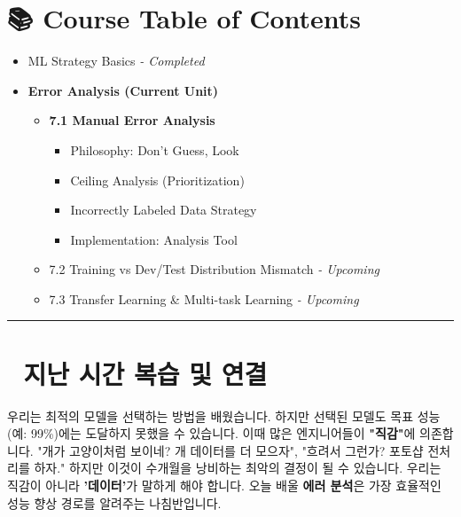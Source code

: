 \documentclass[11pt,a4paper]{book}
\theoremstyle{definition}
\begin{document}
\section*{📚 Course Table of Contents}
\begin{itemize}
    \item[Chapter 1-6.] ML Strategy Basics \textit{- Completed}
    \item[\textbf{Chapter 7.}] \textbf{Error Analysis (Current Unit)}
    \begin{itemize}
        \item \textbf{7.1 Manual Error Analysis}
        \begin{itemize}
            \item Philosophy: Don't Guess, Look
            \item Ceiling Analysis (Prioritization)
            \item Incorrectly Labeled Data Strategy
            \item Implementation: Analysis Tool
        \end{itemize}
        \item 7.2 Training vs Dev/Test Distribution Mismatch \textit{- Upcoming}
        \item 7.3 Transfer Learning \& Multi-task Learning \textit{- Upcoming}
    \end{itemize}
\end{itemize}

\vspace{0.5cm}
\hrule
\vspace{0.5cm}

\section*{🔗 지난 시간 복습 및 연결}
우리는 최적의 모델을 선택하는 방법을 배웠습니다. 하지만 선택된 모델도 목표 성능(예: 99\%)에는 도달하지 못했을 수 있습니다.
이때 많은 엔지니어들이 \textbf{"직감"}에 의존합니다. "개가 고양이처럼 보이네? 개 데이터를 더 모으자", "흐려서 그런가? 포토샵 전처리를 하자."
하지만 이것이 수개월을 낭비하는 최악의 결정이 될 수 있습니다. 우리는 직감이 아니라 \textbf{'데이터'}가 말하게 해야 합니다. 오늘 배울 \textbf{에러 분석}은 가장 효율적인 성능 향상 경로를 알려주는 나침반입니다.

\end{document}
